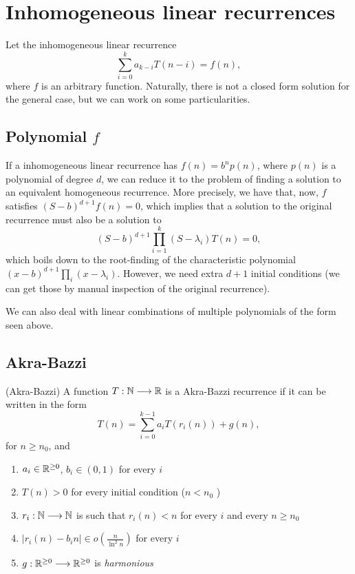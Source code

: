 \section*{Inhomogeneous linear recurrences}

Let the inhomogeneous linear recurrence \[
\sum_{i=0}^{k} a_{k-i}T(n-i) = f(n)
,\] where $f$ is an arbitrary function.
Naturally, there is not a closed form solution for the general case, but we can work on some particularities.

\subsection*{Polynomial $f$}

If a inhomogeneous linear recurrence has $f(n) = b^{n}p(n)$, where $p(n)$ is a polynomial of degree $d$, we can reduce it to the problem of finding a solution to an equivalent homogeneous recurrence.
More precisely, we have that, now, $f$ satisfies $(S-b)^{d+1}f(n) = 0$, which implies that a solution to the original recurrence must also be a solution to \[
    (S-b)^{d+1} \prod_{i=1}^{k} (S-\lambda_i) T(n) = 0 
,\] which boils down to the root-finding of the characteristic polynomial $(x-b)^{d+1} \prod_{i} (x-\lambda_i)$.
However, we need extra $d+1$ initial conditions (we can get those by manual inspection of the original recurrence).

\begin{note}
    We can also deal with linear combinations of multiple polynomials of the form seen above.
\end{note}

\subsection*{Akra-Bazzi}


\begin{definition}
    (Akra-Bazzi) A function $T: \mathbb{N} \longrightarrow \mathbb{R}$ is a Akra-Bazzi recurrence if it can be written in the form \[
    T(n) = \sum_{i=0}^{k-1} a_i T(r_i(n)) + g(n)
    ,\] for $n\ge n_0$, and
    \begin{enumerate}
        \item $a_i \in \mathbb{R}^{\ge 0}$, $b_i\in (0,1)$ for every $i$ 
	\item $T(n) > 0$ for every initial condition ($n < n_0$ )
	\item $r_i: \mathbb{N} \longrightarrow \mathbb{N}$ is such that $r_i(n) < n$ for every $i$ and every $n\ge n_0$ 
	\item $|r_i(n) - b_i n| \in o\left( \frac{n}{\ln^2 n} \right) $ for every $i$ 
	\item $g: \mathbb{R}^{\ge 0} \longrightarrow \mathbb{R}^{\ge 0}$ is \emph{harmonious}
    \end{enumerate}
\end{definition}

